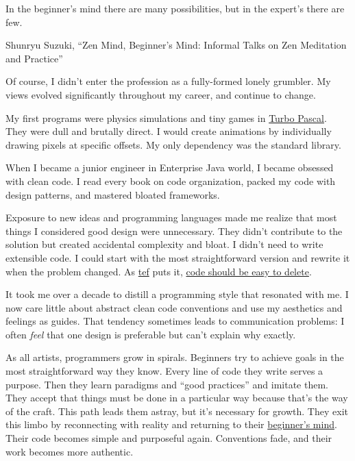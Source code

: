 \documentclass{article}
\begin{document}
\epigraph{
  In the beginner's mind there are many possibilities, but in the expert's there are few.
}{
  Shunryu Suzuki, ``Zen Mind, Beginner's Mind: Informal Talks on Zen Meditation and Practice''
}

Of course, I didn't enter the profession as a fully-formed lonely grumbler.
My views evolved significantly throughout my career, and continue to change.

My first programs were physics simulations and tiny games in \href{https://en.wikipedia.org/wiki/Turbo_Pascal}{Turbo Pascal}.
They were dull and brutally direct.
I would create animations by individually drawing pixels at specific offsets.
My only dependency was the standard library.

When I became a junior engineer in Enterprise Java world, I became obsessed with clean code.
I read every book on code organization, packed my code with design patterns, and mastered bloated frameworks.

Exposure to new ideas and programming languages made me realize that most things I considered good design were unnecessary.
They didn't contribute to the solution but created accidental complexity and bloat.
I didn't need to write extensible code.
I could start with the most straightforward version and rewrite it when the problem changed.
As \href{https://programmingisterrible.com/about}{tef} puts it, \href{https://programmingisterrible.com/post/139222674273/write-code-that-is-easy-to-delete-not-easy-to}{code should be easy to delete}.

It took me over a decade to distill a programming style that resonated with me.
I now care little about abstract clean code conventions and use my aesthetics and feelings as guides.
That tendency sometimes leads to communication problems: I often \emph{feel} that one design is preferable but can't explain why exactly.

As all artists, programmers grow in spirals.
Beginners try to achieve goals in the most straightforward way they know.
Every line of code they write serves a purpose. Then they learn paradigms and ``good practices'' and imitate them.
They accept that things must be done in a particular way because that's the way of the craft.
This path leads them astray, but it's necessary for growth.
They exit this limbo by reconnecting with reality and returning to their \href{https://en.wikipedia.org/wiki/Shoshin}{beginner's mind}.
Their code becomes simple and purposeful again.
Conventions fade, and their work becomes more authentic.
\end{document}
